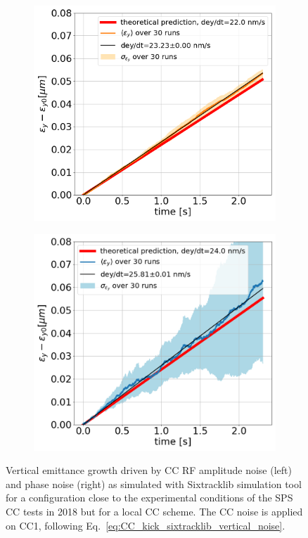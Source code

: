 \begin{figure}[htp]
    \centering
    \begin{subfigure}{.45\textwidth}
        \centering
        \includegraphics[width=.95\linewidth]{images/Ch6/study_2_AN_sixtracklib_local_CC_scheme.png}  
    \end{subfigure}
    \begin{subfigure}{.45\textwidth}
        \centering
        \includegraphics[width=.95\linewidth]{images/Ch6/study_2_sixtracklib_PN_local_CC_scheme.png}
    \end{subfigure}
    \caption{Vertical emittance growth driven by CC RF amplitude noise (left) and phase noise (right) as simulated with Sixtracklib simulation tool for a configuration close to the experimental conditions of the SPS CC tests in 2018 but for a local CC scheme. The CC noise is applied on CC1, following Eq.~\eqref{eq:CC_kick_sixtracklib_vertical_noise}.}
    \label{fig:study_2_sixtracklib_local_cc_scheme}
\end{figure}

